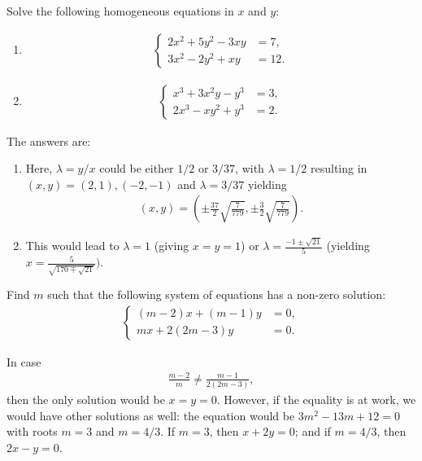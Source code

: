 \begin{question}
    Solve the following homogeneous equations in $x$ and $y$:
    \begin{enumerate}
        \item 
        \begin{align*}
            \begin{cases}
                2x^2+5y^2-3xy &= 7,\\3x^2-2y^2+xy &= 12.
            \end{cases}
        \end{align*}
        \item
        \begin{align*}
            \begin{cases}
                x^3+3x^2y-y^3 &= 3,\\2x^3-xy^2+y^3 &= 2.
            \end{cases}
        \end{align*}
    \end{enumerate}
\end{question}

\begin{solution}
    The answers are:
    \begin{enumerate}
        \item Here, $\lambda=y/x$ could be either $1/2$ or $3/37$, with $\lambda=1/2$ resulting in $(x,y)=(2,1), (-2,-1)$ and $\lambda=3/37$ yielding
        \begin{align*}
            (x,y)=\left(\pm\frac{37}{2}\sqrt{\frac{7}{779}},\pm\frac{3}{2}\sqrt{\frac{7}{779}}\right).
        \end{align*}
        \item This would lead to $\lambda=1$ (giving $x=y=1$) or $\lambda=\frac{-1\pm\sqrt{21}}{5}$ (yielding $x=\frac{5}{\sqrt{170\mp\sqrt{21}}})$.
    \end{enumerate}
\end{solution}


\begin{question}
    Find $m$ such that the following system of equations has a non-zero solution:
    \begin{align*}
        \begin{cases}
            (m-2)x+(m-1)y &=0,\\mx+2(2m-3)y &=0.
        \end{cases}
    \end{align*}
\end{question}
\begin{solution}
    In case
    \begin{align*}
        \frac{m-2}{m}\neq\frac{m-1}{2(2m-3)},
    \end{align*}
    then the only solution would be $x=y=0$. However, if the equality is at work, we would have other solutions as well: the equation would be $3m^2-13m+12=0$ with roots $m=3$ and $m=4/3$. If $m=3$, then $x+2y=0$; and if $m=4/3$, then $2x-y=0$.
\end{solution}

